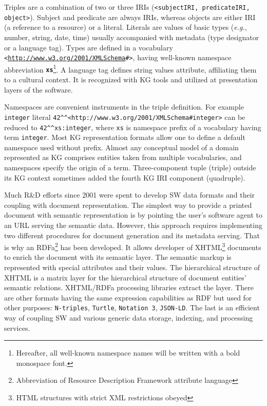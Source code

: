 \documentclass[a4paper]{jctart19a}
\newcommand{\ns}[1]{\textbf{\texttt{#1}}}
\begin{document}
Triples are a combination of two or three IRIs (\texttt{<subjectIRI, predicateIRI, object>}).  Subject and predicate are always IRIs, whereas objects are either IRI (a reference to a resource) or a literal.  Literals are values of basic types (\emph{e.g.}, number, string, date, time) usually accompanied with metadata (type designator or a language tag).  Types are defined in a vocabulary \texttt{<\url{http://www.w3.org/2001/XMLSchema}\#>}, having well-known namespace abbreviation \ns{xs}\footnote{Hereafter, all well-known namespace names will be written with a bold monospace font.}.  A language tag defines string values attribute, affiliating them to a cultural context.  It is recognized with KG tools and utilized at presentation layers of the software.

Namespaces are convenient instruments in the triple definition.  For example \verb|integer| literal \verb|42^^<http://www.w3.org/2001/XMLSchema#integer>| can be reduced to \verb|42^^xs:integer|, where \verb|xs| is namespace prefix of a vocabulary having term \verb|integer|.  Most KG representation formats allow one to define a default namespace used without prefix.  Almost any conceptual model of a domain represented as KG comprises entities taken from multiple vocabularies, and namespaces specify the origin of a term.  Three-component tuple (triple) outside its KG context sometimes added the fourth KG IRI component (quadruple).

Much R\&D efforts since 2001 \cite{tbl} were spent to develop SW data formats and their coupling with document representation.  The simplest way to provide a printed document with semantic representation is by pointing the user's software agent to an URL serving the semantic data.  However, this approach requires implementing two different procedures for document generation and its metadata serving.  That is why an RDFa\footnote{Abbreviation of Resource Description Framework attribute language} has been developed.  It allows developer of XHTML\footnote{HTML structures with strict XML restrictions obeyed} documents to enrich the document with its semantic layer.  The semantic markup is represented with special attributes and their values.  The hierarchical structure of XHTML is a matrix layer for the hierarchical structure of document entities' semantic relations.  XHTML/RDFa processing libraries extract the layer.  There are other formats having the same expression capabilities as RDF but used for other purposes: \texttt{N-triples}, \texttt{Turtle}, \texttt{Notation~3}, \texttt{JSON-LD}.  The last is an efficient way of coupling SW and various generic data storage, indexing, and processing services.
\end{document}
